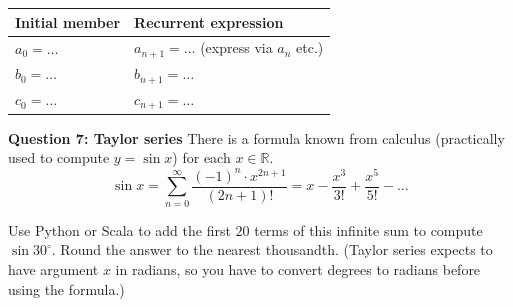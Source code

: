 \documentclass[jou]{apa6}
\begin{document}
\begin{tabular}{|l|l|} \hline
{\bf Initial member} & {\bf Recurrent expression} \\ \hline
$a_0 = \ldots$ & $a_{n+1} = \ldots$ (express via $a_n$ etc.) \\ \hline
$b_0 = \ldots$ & $b_{n+1} = \ldots$ \\ \hline 
$c_0 = \ldots$ & $c_{n+1} = \ldots$ \\ \hline 
\end{tabular}

\vspace{6pt}
{\bf Question 7: Taylor series} There is a formula known from calculus (practically 
used to compute $y = \sin x$) for each $x \in \mathbb{R}$. 
$$\sin x = \sum\limits_{n=0}^{\infty} \frac{(-1)^n \cdot x^{2n+1}}{(2n+1)!} = x - \frac{x^3}{3!}
+ \frac{x^5}{5!} - \ldots$$

Use Python or Scala to add the first $20$ terms of this infinite sum
to compute $\sin 30^{\circ}$. Round the answer
to the nearest thousandth.
(Taylor series expects to have argument $x$ in radians, so you have to convert degrees to radians 
before using the formula.)
\end{document}
